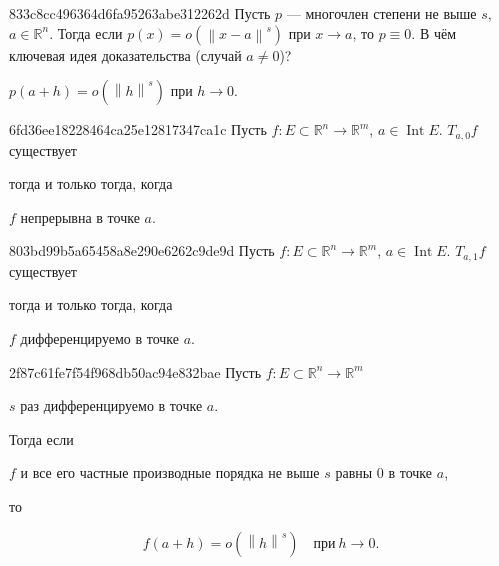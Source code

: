 \begin{note}{833c8cc496364d6fa95263abe312262d}
    Пусть \({ p }\) --- многочлен степени не выше \({ s }\), \({ a \in \mathbb R^{n} }\).
    Тогда если \({ p(x) = o(\left\lVert x - a \right\rVert^{s}) }\) при \({ x \to a }\), то \({ p \equiv 0 }\).
    В чём ключевая идея доказательства (случай \({ a \neq 0 }\))?

    \begin{cloze}{1}
        \({ p(a + h) = o(\left\lVert h \right\rVert^{s}) }\) при \({ h \to 0 }\).
    \end{cloze}
\end{note}

\begin{note}{6fd36ee18228464ca25e12817347ca1c}
    Пусть \({ f : E \subset \mathbb R^{n} \to \mathbb R^{m} }\), \({ a \in \operatorname{Int} E }\).
    \({ T_{a,0}f }\) существует \begin{icloze}{2}тогда и только тогда, когда\end{icloze} \begin{icloze}{1}\({ f }\) непрерывна в точке \({ a }\).\end{icloze}
\end{note}

\begin{note}{803bd99b5a65458a8e290e6262c9de9d}
    Пусть \({ f : E \subset \mathbb R^{n} \to \mathbb R^{m} }\), \({ a \in \operatorname{Int} E }\).
    \({ T_{a,1}f }\) существует \begin{icloze}{2}тогда и только тогда, когда\end{icloze} \begin{icloze}{1}\({ f }\) дифференцируемо в точке \({ a }\).\end{icloze}
\end{note}

\begin{note}{2f87c61fe7f54f968db50ac94e832bae}
    Пусть \({ f : E \subset \mathbb R^{n} \to \mathbb R^{m} }\) \begin{icloze}{3}\({ s }\) раз дифференцируемо в точке \({ a }\).\end{icloze}
    Тогда если \begin{icloze}{2}\({ f }\) и все его частные производные порядка не выше \({ s }\) равны \({ 0 }\) в точке \({ a }\),\end{icloze} то
    \begin{icloze}{1}
        \[
            f(a + h) = o(\left\lVert h \right\rVert^{s}) \quad \text{при}\ h \to 0.
        \]
    \end{icloze}
\end{note}

